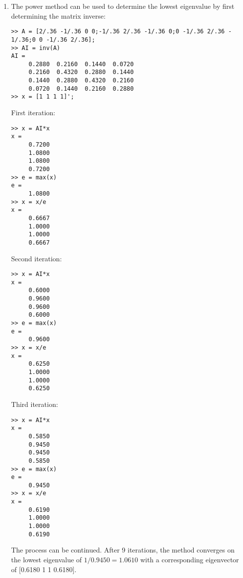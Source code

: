\documentclass[../main.tex]{subfiles}
\begin{document}
\begin{enumerate}[label=\bfseries(\alph*)]
	\bigbreak
\item The power method can be used to determine the lowest eigenvalue by first determining the matrix inverse:
	\bigbreak
\begin{lstlisting}[numbers=none]
>> A = [2/.36 -1/.36 0 0;-1/.36 2/.36 -1/.36 0;0 -1/.36 2/.36 -
1/.36;0 0 -1/.36 2/.36];
>> AI = inv(A)
AI =
	 0.2880	 0.2160	 0.1440	 0.0720
	 0.2160	 0.4320	 0.2880	 0.1440
	 0.1440	 0.2880	 0.4320	 0.2160
	 0.0720	 0.1440	 0.2160	 0.2880
>> x = [1 1 1 1]'; 
\end{lstlisting}
	\bigbreak
First iteration:
	\bigbreak
\begin{lstlisting}[numbers=none]
>> x = AI*x
x =
	 0.7200
	 1.0800
	 1.0800
	 0.7200
>> e = max(x)
e =
	 1.0800
>> x = x/e
x =
	 0.6667
	 1.0000
	 1.0000
	 0.6667 
\end{lstlisting}
	\bigbreak
Second iteration:
	\bigbreak
\begin{lstlisting}[numbers=none]
>> x = AI*x
x =
	 0.6000
	 0.9600
	 0.9600
	 0.6000
>> e = max(x)
e =
	 0.9600
>> x = x/e
x =
	 0.6250
	 1.0000
	 1.0000
	 0.6250
\end{lstlisting}
	\bigbreak
Third iteration:
	\bigbreak
\begin{lstlisting}[numbers=none]
>> x = AI*x
x =
	 0.5850
	 0.9450
	 0.9450
	 0.5850
>> e = max(x)
e =
	 0.9450
>> x = x/e
x =
	 0.6190
	 1.0000
	 1.0000
	 0.6190 
\end{lstlisting}
	\bigbreak
The process can be continued. After 9 iterations, the method converges on the lowest eigenvalue of $1 / 0.9450=1.0610$ with a corresponding eigenvector of [0.6180  1 1 0.6180].
	\bigbreak
\end{enumerate}
\end{document}
